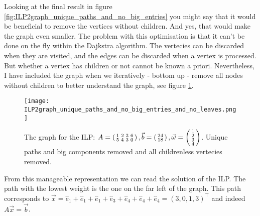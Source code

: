 Looking at the final result in figure \ref{fig:ILP2graph_unique_paths_and_no_big_entries} you might say that it would be beneficial to remove the vertices without children. And yes, that would make the graph even smaller. The problem with this optimisation is that it can't be done on the fly within the Dajkstra algorithm. The vertecies can be discarded when they are visited, and the edges can be discarded when a vertex is processed. But whether a vertex has children or not cannot be known a priori. Nevertheless, I have included the graph when we iteratively - bottom up - remove all nodes without children to better understand the graph, see figure \ref{fig:ILP2graph_unique_paths_and_no_big_entries_and_no_leaves}.

\begin{figure}
    \texttt{[image: ILP2graph\_unique\_paths\_and\_no\_big\_entries\_and\_no\_leaves.png]}
    \caption{\label{fig:ILP2graph_unique_paths_and_no_big_entries_and_no_leaves}The graph for the ILP: $A = \left(\begin{smallmatrix}1&2&3&6\\5&4&3&0\end{smallmatrix}\right), \vec b = \left(\begin{smallmatrix}24\\18\end{smallmatrix}\right), \vec \omega = \left(\begin{smallmatrix}1\\2\\3\\4\end{smallmatrix}\right)$. Unique paths and big components removed and all childrenless vertecies removed.}
\end{figure}

From this manageable representation we can read the solution of the ILP. The path with the lowest weight is the one on the far left of the graph. This path corresponds to $\vec x = \hat e_1 + \hat e_1 + \hat e_1 + \hat e_3 + \hat e_4 + \hat e_4 + \hat e_4 = (3, 0, 1, 3)^\top$ and indeed $A\vec x = \vec b$. 

